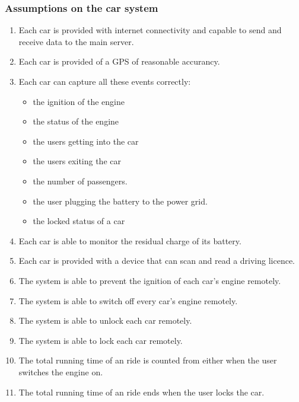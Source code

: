 \documentclass[11pt]{article} %
\begin{document}
\subsubsection{Assumptions on the car system}
\begin{enumerate}
	\item  Each car is provided with internet connectivity and capable to send and receive data to the main server.
	\item  Each car is provided of a GPS of reasonable accurancy.
	\item  Each car can capture all these events correctly:
		\begin{itemize}
			\item the ignition of the engine
			\item the status of the engine
			\item the users getting into the car
			\item the users exiting the car 
			\item the number of passengers.
			\item the user plugging the battery to the power grid.
			\item the locked status of a car
		\end{itemize}
	\item Each car is able to monitor the residual charge of its battery.
	\item Each car is provided with a device that can scan and read a driving licence.
	\item The system is able to prevent the ignition of each car's engine remotely.
	\item The system is able to switch off every car's engine remotely.
	\item The system is able to unlock each car remotely.
	\item The system is able to lock each car remotely.
	\item The total running time of an ride is counted from either when the user switches the engine on.
	\item The total running time of an ride ends when the user locks the car.
\end{enumerate}
\end{document}
